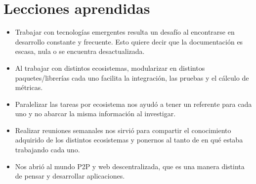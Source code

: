 \section{Lecciones aprendidas}

\begin{itemize}
    \item Trabajar con tecnologías emergentes resulta un desafío al encontrarse en desarrollo constante y frecuente. Esto quiere decir que la documentación es escasa, nula o se encuentra desactualizada.
    
    \item Al trabajar con distintos ecosistemas, modularizar en distintos paquetes/librerías cada uno facilita la integración, las pruebas y el cálculo de métricas.

    \item Paralelizar las tareas por ecosistema nos ayudó a tener un referente para cada uno y no abarcar la misma información al investigar.

    \item Realizar reuniones semanales nos sirvió para compartir el conocimiento adquirido de los distintos ecosistemas y ponernos al tanto de en qué estaba trabajando cada uno.

    \item Nos abrió al mundo P2P y web descentralizada, que es una manera distinta de pensar y desarrollar aplicaciones.

\end{itemize}
